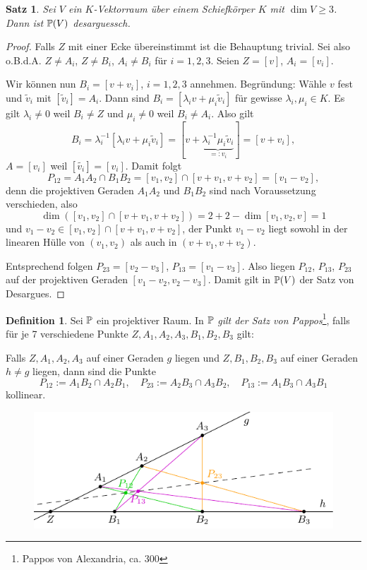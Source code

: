 \documentclass[
 a4paper,
 12pt,
 parskip=half
 ]{scrartcl}
\theoremstyle{plain}
\newtheorem{thm}{Satz}[section] %
\theoremstyle{definition}
\newtheorem*{defn*}{Definition}
\begin{document}
\begin{thm}
 Sei $V$ ein $K$-Vektorraum über einem Schiefkörper $K$ mit $\dim V \ge 3$. Dann ist $\mathbb{P}(V)$ desarguessch.
\end{thm}

\begin{proof}
 Falls $Z$ mit einer Ecke übereinstimmt ist die Behauptung trivial. Sei also o.B.d.A. $Z \ne A_i$, $Z \ne B_i$, $A_i \ne B_i$ für $i = 1,2,3$. Seien $Z = [v]$, $A_i = [v_i]$. 
 
 Wir können nun $B_i = [v + v_i]$, $i = 1,2,3$ annehmen. Begründung: Wähle $v$ fest und $\tilde{v}_i$ mit $[\tilde{v}_i] = A_i$. Dann sind $B_i = [\lambda_i v + \mu_i \tilde{v}_i]$ für gewisse $\lambda_i, \mu_i \in K$. Es gilt $\lambda_i \ne 0$ weil $B_i \ne Z$ und $\mu_i \ne 0$ weil $B_i \ne A_i$. Also gilt 
 \[ B_i = \lambda_i^{-1} [\lambda_i v + \mu_i \tilde{v}_i] = [v + \underbrace{\lambda_i^{-1} \mu_i \tilde{v}_i}_{=: v_i}] = [v + v_i], \]
 $A = [v_i]$ weil $[\tilde{v_i}] = [v_i]$. Damit folgt 
 \[ P_{12} = A_1 A_2 \cap B_1 B_2 = [v_1 , v_2] \cap [v + v_1, v + v_2 ] = [v_1 - v_2], \]
 denn die projektiven Geraden $A_1 A_2$ und $B_1 B_2$ sind nach Voraussetzung verschieden, also
 \[ \dim( [v_1, v_2] \cap [v + v_1, v + v_2 ] ) = 2 + 2 - \dim[v_1, v_2, v] = 1 \]
 und $v_1 - v_2 \in [v_1, v_2] \cap [v + v_1, v + v_2]$, der Punkt $v_1-v_2$ liegt sowohl in der linearen Hülle von $(v_1, v_2)$ als auch in $(v + v_1, v + v_2)$.

 Entsprechend folgen $P_{23} = [v_2 - v_3]$, $P_{13} = [v_1 - v_3]$. Also liegen $P_{12}$, $P_{13}$, $P_{23}$ auf der projektiven Geraden $[v_1 - v_2, v_2 - v_3]$. Damit gilt in $\mathbb{P}(V)$ der Satz von Desargues.
\end{proof}

\begin{defn*}
 Sei $\mathbb{P}$ ein projektiver Raum. In $\mathbb{P}$ \emph{gilt der Satz von Pappos}\footnote{Pappos von Alexandria, ca. 300}, falls für je 7 verschiedene Punkte $Z, A_1, A_2, A_3, B_1, B_2, B_3$ gilt:
 \begin{addmargin}[.5cm]{0cm} 
 Falls $Z, A_1, A_2, A_3$ auf einer Geraden $g$ liegen und $Z, B_1, B_2, B_3$ auf einer Geraden $h \ne g$ liegen, dann sind die Punkte 
 \[ P_{12} := A_1 B_2 \cap A_2 B_1, \quad P_{23} := A_2 B_3 \cap A_3 B_2, \quad P_{13} := A_1 B_3 \cap A_3 B_1 \]
 kollinear.
 \end{addmargin}
\end{defn*}

\begin{figure}[ht]
 \center
 \includegraphics[width=12cm]{img/pappos}
\end{figure}
\end{document}
